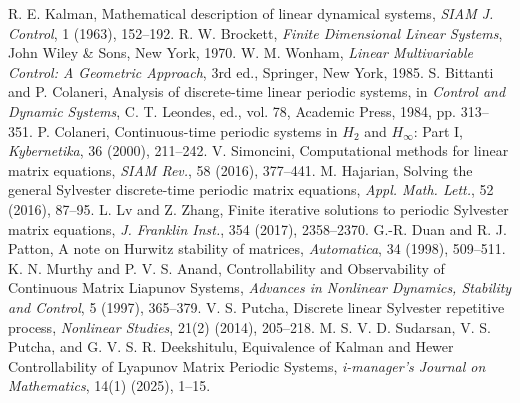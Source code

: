 \documentclass[5p,times]{elsarticle} %
\begin{document}

\begin{thebibliography}{99}

R. E. Kalman, Mathematical description of linear dynamical systems, \emph{SIAM J. Control}, 1 (1963), 152--192.
R. W. Brockett, \emph{Finite Dimensional Linear Systems}, John Wiley \& Sons, New York, 1970.
W. M. Wonham, \emph{Linear Multivariable Control: A Geometric Approach}, 3rd ed., Springer, New York, 1985.
S. Bittanti and P. Colaneri, Analysis of discrete-time linear periodic systems, in \emph{Control and Dynamic Systems}, C. T. Leondes, ed., vol. 78, Academic Press, 1984, pp. 313--351.
P. Colaneri, Continuous-time periodic systems in \(H_2\) and \(H_\infty\): Part I, \emph{Kybernetika}, 36 (2000), 211--242.
V. Simoncini, Computational methods for linear matrix equations, \emph{SIAM Rev.}, 58 (2016), 377--441.
M. Hajarian, Solving the general Sylvester discrete-time periodic matrix equations, \emph{Appl. Math. Lett.}, 52 (2016), 87--95.
L. Lv and Z. Zhang, Finite iterative solutions to periodic Sylvester matrix equations, \emph{J. Franklin Inst.}, 354 (2017), 2358--2370.
G.-R. Duan and R. J. Patton, A note on Hurwitz stability of matrices, \emph{Automatica}, 34 (1998), 509--511.
K. N. Murthy and P. V. S. Anand, Controllability and Observability of Continuous Matrix Liapunov Systems, \emph{Advances in Nonlinear Dynamics, Stability and Control}, 5 (1997), 365--379.
V. S. Putcha, Discrete linear Sylvester repetitive process, \emph{Nonlinear Studies}, 21(2) (2014), 205--218.
M. S. V. D. Sudarsan, V. S. Putcha, and G. V. S. R. Deekshitulu, Equivalence of Kalman and Hewer Controllability of Lyapunov Matrix Periodic Systems, \emph{i-manager's Journal on Mathematics}, 14(1) (2025), 1--15.
\end{thebibliography}

\appendix
\end{document}
